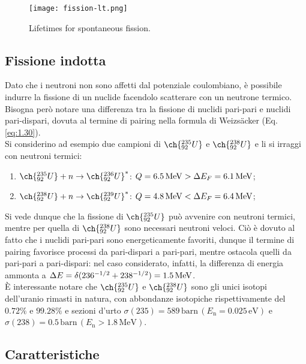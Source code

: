 \begin{figure}[!hb]
	\centering
	\texttt{[image: fission-lt.png]}
	\caption{Lifetimes for spontaneous fission.}
	\label{fission-lt}
\end{figure}

\subsection{Fissione indotta}

Dato che i neutroni non sono affetti dal potenziale coulombiano, è possibile indurre la fissione di un nuclide facendolo scatterare con un neutrone termico. Bisogna però notare una differenza tra la fissione di nuclidi pari-pari e nuclidi pari-dispari, dovuta al termine di pairing nella formula di Weizsäcker (Eq. \ref{eq:1.30}).\\
Si considerino ad esempio due campioni di $ \ch{^{235}_{92} U} $ e $ \ch{^{238}_{92} U} $ e li si irraggi con neutroni termici:
\begin{enumerate}
	\item $ \ch{^{235}_{92} U} + n \rightarrow \ch{^{236}_{92} U}^* $: $ Q = 6.5\,\mathrm{MeV} > \Delta E_F = 6.1\,\mathrm{MeV} $;
	\item $ \ch{^{238}_{92} U} + n \rightarrow \ch{^{239}_{92} U}^* $: $ Q = 4.8\,\mathrm{MeV} < \Delta E_F = 6.4\,\mathrm{MeV} $;
\end{enumerate}
Si vede dunque che la fissione di $ \ch{^{235}_{92} U} $ può avvenire con neutroni termici, mentre per quella di $ \ch{^{238}_{92} U} $ sono necessari neutroni veloci. Ciò è dovuto al fatto che i nuclidi pari-pari sono energeticamente favoriti, dunque il termine di pairing favorisce processi da pari-dispari a pari-pari, mentre ostacola quelli da pari-pari a pari-dispari: nel caso considerato, infatti, la differenza di energia ammonta a $ \Delta E = \delta (236^{-1/2} + 238^{-1/2}) = 1.5\,\mathrm{MeV} $.\\
È interessante notare che $ \ch{^{235}_{92} U} $ e $ \ch{^{238}_{92} U} $ sono gli unici isotopi dell'uranio rimasti in natura, con abbondanze isotopiche rispettivamente del $ 0.72\% $ e $ 99.28\% $ e sezioni d'urto $\sigma(235) = 589 \, \text{barn} \, (E_\text{n}=0.025 \, \text{eV})$ e $\sigma(238) = 0.5 \, \text{barn} \, (E_\text{n}>1.8 \, \text{MeV})$.

\subsection{Caratteristiche}

